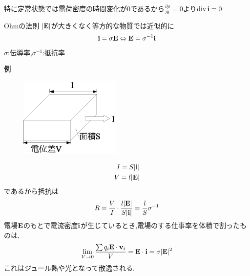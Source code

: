 \documentclass[../main]{subfiles}
\begin{document}
特に定常状態では電荷密度の時間変化が0であるから$\frac{\partial \rho}{\partial t}=0$より${\rm div}\,{\bf i}=0$
\\
\begin{itembox}[c]{Ohmの法則}
$|{\bf E}|$が大きくなく等方的な物質では近似的に
\begin{eqnarray}
{\bf i} = \sigma {\bf E} \Leftrightarrow {\bf E} = \sigma^{-1} {\bf i}
\end{eqnarray}
$\sigma$:伝導率,$\sigma^{-1}$:抵抗率
\end{itembox}
{\bf 例} \\
\begin{figure}[htbp]
 \begin{center}
  \includegraphics[width=50mm]{7.6.eps}
 \end{center}
 \caption{}
 \label{fig:six}
\end{figure}
\begin{eqnarray*}
I = S |{\bf i}| \\
V = l |{\bf E}|
\end{eqnarray*}
であるから抵抗は
\begin{eqnarray*}
R=\frac{V}{I} \cdot \frac{ l |{\bf E}|}{S |{\bf i}|} = \frac{l}{S}\sigma^{-1}
\end{eqnarray*}
電場${\bf E}$のもとで電流密度${\bf i}$が生じているとき,電場のする仕事率を体積で割ったものは,
\begin{eqnarray*}
\lim_{V \to 0} \frac{ \sum q_i {\bf E}  \cdot {\bf v}_i}{V} = {\bf E} \cdot {\bf i} = \sigma |{\bf E}|^2
\end{eqnarray*}
これはジュール熱や光となって散逸される.
\end{document}
